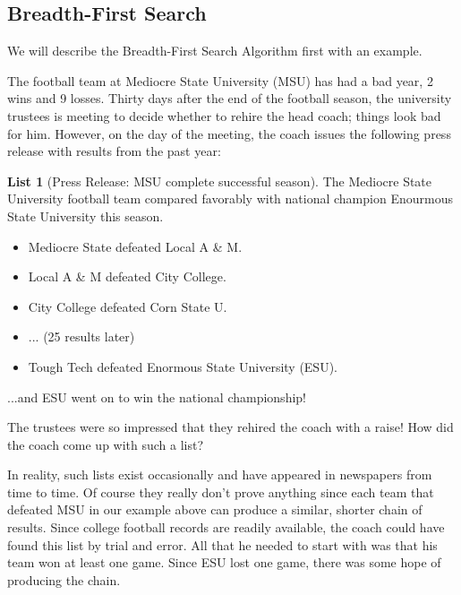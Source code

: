 \documentclass[10pt,]{book}
\theoremstyle{plain}
\theoremstyle{definition}
\theoremstyle{definition}
\theoremstyle{definition}
\theoremstyle{definition}
\theoremstyle{definition}
\newtheorem{listwrapper}[theorem]{List}
\numberwithin{equation}{section}
\begin{document}
\subsection[Breadth-First Search]{Breadth-First Search}\label{ss-breadth-first-search}
We will describe the Breadth-First Search Algorithm first with an example.%
\par
 The football team at Mediocre State University (MSU) has had a bad year, 2 wins and 9 losses. Thirty days after the end of the football season, the university trustees is meeting to decide whether to rehire the head coach; things look bad for him. However, on the day
of the meeting, the coach issues the following press release with results from the past year:%
\begin{listwrapper}[Press Release: MSU complete successful season]\label{list-4}
\typeout{************************************************}
\typeout{************************************************}
The Mediocre State University football team compared favorably with national champion Enourmous State University this season.%
\leavevmode%
\begin{itemize}[label=\textbullet]
\item{}Mediocre State defeated Local A & M.%
\item{}Local A & M defeated City College.%
\item{}City College defeated Corn State U.%
\item{}... (25 results later)%
\item{}Tough Tech defeated Enormous State University (ESU).%
\end{itemize}
\typeout{************************************************}
\typeout{************************************************}
\bigbreak
...and ESU went on to win the national championship!%
\end{listwrapper}
\par
The trustees were so impressed that they rehired the coach with a raise! How did the coach come up with such a list?%
\par
In reality, such lists exist occasionally and have appeared in newspapers from time to time. Of course they really don't prove anything since each team that defeated MSU in our example above can produce a similar, shorter chain of results. Since college football records are readily available, the coach could have found this list by trial and error. All that he needed to start with was that his team won at least one game. Since ESU lost one game, there was some hope of producing the chain.%
\end{document}

